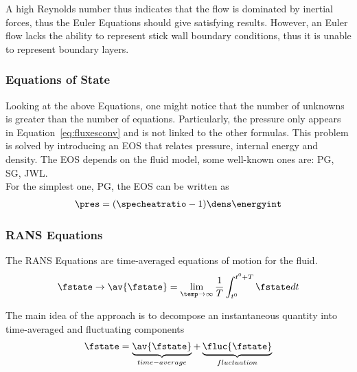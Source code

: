 \documentclass[../main.tex]{subfiles}
\begin{document}
A high Reynolds number thus indicates that the flow is dominated by inertial forces, thus the Euler Equations should give satisfying results. However, an Euler flow lacks the ability to represent stick wall boundary conditions, thus it is unable to represent boundary layers.

\subsubsection{Equations of State}
Looking at the above Equations, one might notice that the number of unknowns is greater than the number of equations. Particularly, the pressure only appears in Equation~\eqref{eq:fluxesconv} and is not linked to the other formulas. This problem is solved by introducing an \acf{EOS} that relates pressure, internal energy and density. The \ac{EOS} depends on the fluid model, some well-known ones are: \ac{PG}, \ac{SG}, \ac{JWL}.\\
For the simplest one, PG, the \ac{EOS} can be written as
\begin{align}\label{eq:eos_pg}
\pres=(\specheatratio-1)\dens\energyint
\end{align}


\subsubsection{\acl{RANS} Equations}\label{sec:rans}
The \acf{RANS} Equations are time-averaged equations of motion for the fluid.
\begin{align}\label{eq:rans_averaging}
\fstate \rightarrow \av{\fstate} = \lim_{\temp \to \infty} \frac{1}{T} \int_{t^0}^{t^0+T} \fstate dt
\end{align}

The main idea of the approach is to decompose an instantaneous quantity into time-averaged and fluctuating components
\begin{align}\label{eq:rans_decomposition}
\fstate=\underbrace{\av{\fstate}}_{time-average}+\underbrace{\fluc{\fstate}}_{fluctuation}
\end{align}
\end{document}
